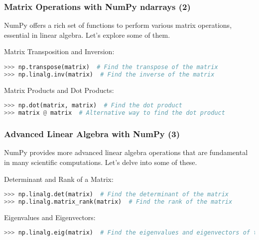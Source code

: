 \begin{frame}[fragile]
  \frametitle{Matrix Operations with NumPy ndarrays (2)}
  NumPy offers a rich set of functions to perform various matrix operations, essential in linear algebra. Let's explore some of them.\pause

  Matrix Transposition and Inversion:
  \begin{lstlisting}[language=Python, numbers=none]
>>> np.transpose(matrix)  # Find the transpose of the matrix
>>> np.linalg.inv(matrix)  # Find the inverse of the matrix
  \end{lstlisting}\pause

  Matrix Products and Dot Products:
  \begin{lstlisting}[language=Python, numbers=none]
>>> np.dot(matrix, matrix)  # Find the dot product
>>> matrix @ matrix  # Alternative way to find the dot product
  \end{lstlisting}
\end{frame}

\begin{frame}[fragile]
  \frametitle{Advanced Linear Algebra with NumPy (3)}
  NumPy provides more advanced linear algebra operations that are fundamental in many scientific computations. Let’s delve into some of these.\pause
  
  Determinant and Rank of a Matrix:
  \begin{lstlisting}[language=Python, numbers=none]
>>> np.linalg.det(matrix)  # Find the determinant of the matrix
>>> np.linalg.matrix_rank(matrix)  # Find the rank of the matrix
  \end{lstlisting}\pause
  
  Eigenvalues and Eigenvectors:
  \begin{lstlisting}[language=Python, numbers=none]
>>> np.linalg.eig(matrix)  # Find the eigenvalues and eigenvectors of the matrix
  \end{lstlisting}
\end{frame}


